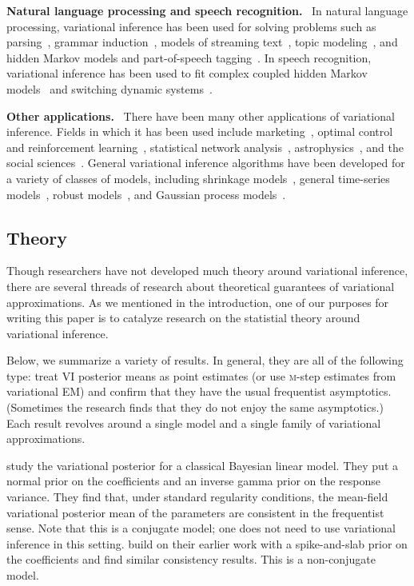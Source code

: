 \documentclass{article}
\DeclareRobustCommand{\parhead}[1]{\textbf{#1}~}
\begin{document}
\parhead{Natural language processing and speech recognition.}  In
natural language processing, variational inference has been used for
solving problems such as parsing~\citep{Liang:2007,Liang:2009b},
grammar induction~\citep{Kurihara:2006,Naseem:2010,Cohen:2010a},
models of streaming text~\citep{Yogatama:2014}, topic
modeling~\citep{Blei:2003b}, and hidden Markov models and part-of-speech
tagging~\citep{Wang:2013b}.  In speech recognition, variational
inference has been used to fit complex coupled
hidden Markov models~\citep{Reyes-Gomez:2004} and switching dynamic
systems~\citep{Deng:2004}.

\parhead{Other applications.}  There have been many other applications
of variational inference.  Fields in which it has been used include
marketing~\citep{Braun:2010}, optimal control and reinforcement
learning~\citep{Van-Den-Broek:2008, Furmston:2010}, statistical
network analysis~\citep{Wiggins:2008,Airoldi:2008},
astrophysics~\citep{Regier:2015}, and the social
sciences~\citep{Erosheva:2007,Grimmer:2010a}.  General variational
inference algorithms have been developed for a variety of classes of
models, including shrinkage models~\citep{Armagan:2011a,Armagan:2011},
general time-series
models~\citep{Roberts:2004a,Barber:2006,Johnson:2014,Foti:2014},
robust models~\citep{Tipping:2005,Wang:2015}, and Gaussian process
models~\citep{Titsias:2010,Damianou:2011,Hensman:2014}.
 
\subsection{Theory}
\label{sec:theory}

Though researchers have not developed much theory around variational
inference, there are several threads of research about theoretical
guarantees of variational approximations. As we mentioned in the
introduction, one of our purposes for writing this paper is to
catalyze research on the statistial theory around variational
inference.

Below, we summarize a variety of results.  In general, they are all of
the following type: treat \gls{VI} posterior means as point estimates
(or use \textsc{m}-step estimates from variational \gls{EM}) and
confirm that they have the usual frequentist asymptotics. (Sometimes
the research finds that they do not enjoy the same asymptotics.) Each
result revolves around a single model and a single family of variational
approximations.

\citet{you2014variational} study the variational posterior for a
classical Bayesian linear model. They put a normal prior on the
coefficients and an inverse gamma prior on the response variance. They
find that, under standard regularity conditions, the mean-field
variational posterior mean of the parameters are consistent in the
frequentist sense. Note that this is a conjugate model; one does not
need to use variational inference in this setting. \citet{you2014}
build on their earlier work with a spike-and-slab prior on the
coefficients and find similar consistency results. This is a
non-conjugate model.
\end{document}
